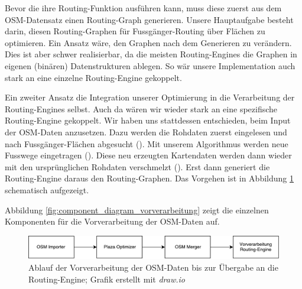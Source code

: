 Bevor die  ihre Routing-Funktion ausführen kann, muss diese zuerst aus dem \ac{OSM}-Datensatz einen Routing-Graph generieren. Unsere Hauptaufgabe besteht darin, diesen Routing-Graphen für Fussgänger-Routing über Flächen zu optimieren. Ein Ansatz wäre, den Graphen nach dem Generieren zu verändern. Dies ist aber schwer realisierbar, da die meisten Routing-Engines die Graphen in eigenen (binären) Datenstrukturen ablegen. So wär unsere Implementation auch stark an eine einzelne Routing-Engine gekoppelt.

Ein zweiter Ansatz die Integration unserer Optimierung in die Verarbeitung der Routing-Engines selbst. Auch da wären wir wieder stark an eine spezifische Routing-Engine gekoppelt.
Wir haben uns stattdessen entschieden, beim Input der \ac{OSM}-Daten anzusetzen. Dazu werden die Rohdaten zuerst eingelesen und nach Fussgänger-Flächen abgesucht (). Mit unserem Algorithmus werden neue Fusswege eingetragen (). Diese neu erzeugten Kartendaten werden dann wieder mit den ursprünglichen Rohdaten verschmelzt (). Erst dann generiert die Routing-Engine daraus den Routing-Graphen. Das Vorgehen ist in Abbildung \ref{fig:workflow_vorverarbeitung} schematisch aufgezeigt.

Abbildung \ref{fig:component_diagram_vorverarbeitung} zeigt die einzelnen Komponenten für die Vorverarbeitung der \ac{OSM}-Daten auf.


\begin{figure}[ht]
    \centering
    \includegraphics[width=1\linewidth]{projectdoc/img/workflow_vorverarbeitung.pdf}
    \caption[Ablauf Vorverarbeitung]{Ablauf der Vorverarbeitung der \ac{OSM}-Daten bis zur Übergabe an die Routing-Engine; Grafik erstellt mit \emph{draw.io}}
    \label{fig:workflow_vorverarbeitung}
\end{figure}
    


